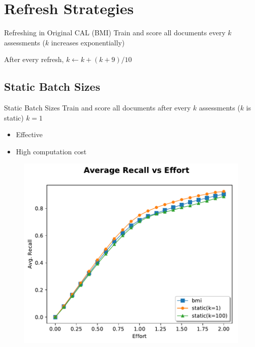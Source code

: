 \documentclass{beamer}
\begin{document}
\section{Refresh Strategies}

\begin{frame}{Refreshing in Original CAL (BMI)}
Train and score all documents every $k$ assessments ($k$ increases exponentially)

\vskip 1cm
After every refresh,
$k← k + (k + 9)/10$
\end{frame}


\subsection{Static Batch Sizes}
\begin{frame}{Static Batch Sizes}
Train and score all documents after every $k$ assessments ($k$ is static)
\vskip 1cm
$k = 1$
\begin{itemize}
\item Effective
\item High computation cost
\end{itemize}
\end{frame}


\begin{frame}
\begin{figure}
 \centering 
 \includegraphics[width=1.0\textwidth]{static1.pdf}
\end{figure}
\end{frame}
\end{document}
